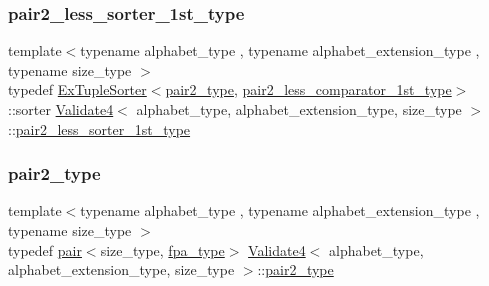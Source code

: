 \subsubsection{\texorpdfstring{pair2\+\_\+less\+\_\+sorter\+\_\+1st\+\_\+type}{pair2\_less\_sorter\_1st\_type}}
{\footnotesize\ttfamily template$<$typename alphabet\+\_\+type , typename alphabet\+\_\+extension\+\_\+type , typename size\+\_\+type $>$ \\
typedef \hyperlink{struct_ex_tuple_sorter}{Ex\+Tuple\+Sorter}$<$\hyperlink{class_validate4_a655c0013e7d26a0653ab8f4f96145bad}{pair2\+\_\+type}, \hyperlink{class_validate4_af39ac6db5faa77a64ab49a75f92337a3}{pair2\+\_\+less\+\_\+comparator\+\_\+1st\+\_\+type}$>$\+::sorter \hyperlink{class_validate4}{Validate4}$<$ alphabet\+\_\+type, alphabet\+\_\+extension\+\_\+type, size\+\_\+type $>$\+::\hyperlink{class_validate4_ad945003027abfd152a0e177d7541580d}{pair2\+\_\+less\+\_\+sorter\+\_\+1st\+\_\+type}\hspace{0.3cm}{\ttfamily [private]}}

\mbox{\label{class_validate4_a655c0013e7d26a0653ab8f4f96145bad}} 
\subsubsection{\texorpdfstring{pair2\+\_\+type}{pair2\_type}}
{\footnotesize\ttfamily template$<$typename alphabet\+\_\+type , typename alphabet\+\_\+extension\+\_\+type , typename size\+\_\+type $>$ \\
typedef \hyperlink{structpair}{pair}$<$size\+\_\+type, \hyperlink{common_8h_a7fdaf8b9b3d2f6ae6b10597a8d3f96ee}{fpa\+\_\+type}$>$ \hyperlink{class_validate4}{Validate4}$<$ alphabet\+\_\+type, alphabet\+\_\+extension\+\_\+type, size\+\_\+type $>$\+::\hyperlink{class_validate4_a655c0013e7d26a0653ab8f4f96145bad}{pair2\+\_\+type}\hspace{0.3cm}{\ttfamily [private]}}

\mbox{\label{class_validate4_a12c8c95c3ef8bf9f3521b439454c5aa0}} 
